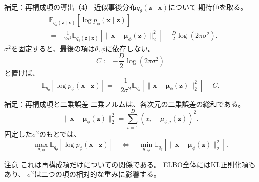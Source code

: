 \begin{frame}{補足：再構成項の導出（4）}
    近似事後分布$q_\theta(\boldsymbol{z}\mid\boldsymbol{x})$について
    期待値を取る。
    \begin{align*}
        &\mathbb{E}_{q_\theta(\boldsymbol{z}\mid\boldsymbol{x})}
        [\log p_\phi(\boldsymbol{x}\mid\boldsymbol{z})]\\[4pt]
        &=
        -\frac{1}{2\sigma^2}
        \mathbb{E}_{q_\theta(\boldsymbol{z}\mid\boldsymbol{x})}
        \left[
        \|\boldsymbol{x}
        -\boldsymbol{\mu}_\phi(\boldsymbol{z})\|_2^2
        \right]
        -
        \frac{D}{2}\log(2\pi\sigma^2).
    \end{align*}
    $\sigma^2$を固定すると、最後の項は$\theta,\phi$に依存しない。
    \[
        C:=-\frac{D}{2}\log(2\pi\sigma^2)
    \]
    と置けば、
    \[
        \boxed{
        \mathbb{E}_{q_\theta}
        [\log p_\phi(\boldsymbol{x}\mid\boldsymbol{z})]
        =
        -\frac{1}{2\sigma^2}
        \mathbb{E}_{q_\theta}
        \left[
        \|\boldsymbol{x}
        -\boldsymbol{\mu}_\phi(\boldsymbol{z})\|_2^2
        \right]+C
        }.
    \]
\end{frame}
\begin{frame}{補足：再構成項と二乗誤差}
    二乗ノルムは、各次元の二乗誤差の総和である。
    \[
        \|\boldsymbol{x}
        -\boldsymbol{\mu}_\phi(\boldsymbol{z})\|_2^2
        =
        \sum_{i=1}^{D}
        \left(
        x_i-\mu_{\phi,i}(\boldsymbol{z})
        \right)^2.
    \]
    固定した$\sigma^2$のもとでは、
    \[
        \boxed{
        \max_{\theta,\phi}
        \mathbb{E}_{q_\theta}
        [\log p_\phi(\boldsymbol{x}\mid\boldsymbol{z})]
        \quad\Longleftrightarrow\quad
        \min_{\theta,\phi}
        \mathbb{E}_{q_\theta}
        \left[
        \|\boldsymbol{x}
        -\boldsymbol{\mu}_\phi(\boldsymbol{z})\|_2^2
        \right]
        }.
    \]
    \begin{alertblock}{注意}
        これは再構成項だけについての関係である。
        ELBO全体にはKL正則化項もあり、
        $\sigma^2$は二つの項の相対的な重みに影響する。
    \end{alertblock}
\end{frame}
